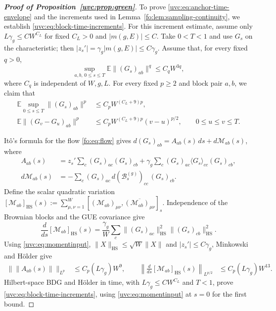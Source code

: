 \documentclass[11pt]{article}
\numberwithin{equation}{section}
\theoremstyle{remark}
\newcommand{\E}{\mathbb E}
\newcommand{\HS}{\mathrm{HS}}
\begin{document}
\begin{proof}[\textbf{Proof of Proposition~\ref{uvc:prop:green}}]
To prove \eqref{uvc:eq:anchor-time-envelope} and the increments used in
Lemma~\ref{fo:lem:sampling-continuity}, we establish
\eqref{uvc:eq:block-time-increments}.
For this increment estimate, assume only $L\gamma_g\le CW^{C_L}$
for fixed $C_L>0$ and $|m(g,E)|\le C$.
Take $0<T<1$ and use $G_s$ on the characteristic;
then $|z_s'|=\gamma_g|m(g,E)|\le C\gamma_g$. Assume that, for every
fixed $q>0$,
\begin{equation}\label{uvc:eq:momentinput}
 \sup_{a,b,\,0\le s\le T}\E\|(G_s)_{ab}\|^q\le C_qW^{3q},
\end{equation}
where $C_q$ is independent of $W,g,L$. For every fixed $p\ge2$
and block pair $a,b$, we claim that
\begin{equation}\label{uvc:eq:block-time-increments}
 \begin{aligned}
 \E\sup_{0\le s\le T}\|(G_s)_{ab}\|^p
     &\le C_pW^{(C_L+9)p},\\
 \E\|(G_v-G_u)_{ab}\|^p
     &\le C_pW^{(C_L+9)p}(v-u)^{p/2},\qquad 0\le u\le v\le T.
 \end{aligned}
\end{equation}

It\^o's formula for the flow \eqref{fo:eq:flow} gives
$d(G_s)_{ab}=A_{ab}(s)\,ds+d\mathcal M_{ab}(s)$, where
\[
 \begin{aligned}
 A_{ab}(s)&=z_s'\sum_c(G_s)_{ac}(G_s)_{cb}
       +\gamma_g\sum_c(G_s)_{ac}\langle G_s\rangle_{cc}(G_s)_{cb},\\
 d\mathcal M_{ab}(s)&=-\sum_c(G_s)_{ac}\,d(\mathcal B_s^{(g)})_{cc}\,(G_s)_{cb}.
 \end{aligned}
\]
Define the scalar quadratic variation
$[\mathcal M_{ab}]_{\HS}(s):=\sum_{\mu,\nu=1}^W
[(\mathcal M_{ab})_{\mu\nu},\overline{(\mathcal M_{ab})_{\mu\nu}}]_s$.
Independence of the Brownian blocks and the GUE covariance give
\[
 \frac{d}{ds}[\mathcal M_{ab}]_{\HS}(s)
 =\frac{\gamma_g}{W}\sum_c
       \|(G_s)_{ac}\|_{\HS}^2\|(G_s)_{cb}\|_{\HS}^2.
\]
Using \eqref{uvc:eq:momentinput}, $\|X\|_{\HS}\le\sqrt W\|X\|$
and $|z_s'|\le C\gamma_g$, Minkowski and H\"older give
\[
 \begin{aligned}
 \bigl\|\|A_{ab}(s)\|\bigr\|_{L^p}
 &\le C_p(L\gamma_g)W^9,\qquad
 \left\|\frac{d}{ds}[\mathcal M_{ab}]_{\HS}(s)\right\|_{L^{p/2}}
 &\le C_p(L\gamma_g)W^{13}.
 \end{aligned}
\]
Hilbert-space BDG and H\"older in time, with $L\gamma_g\le CW^{C_L}$ and
$T<1$, prove \eqref{uvc:eq:block-time-increments}, using
\eqref{uvc:eq:momentinput} at $s=0$ for the first bound.


\end{proof}
\end{document}
